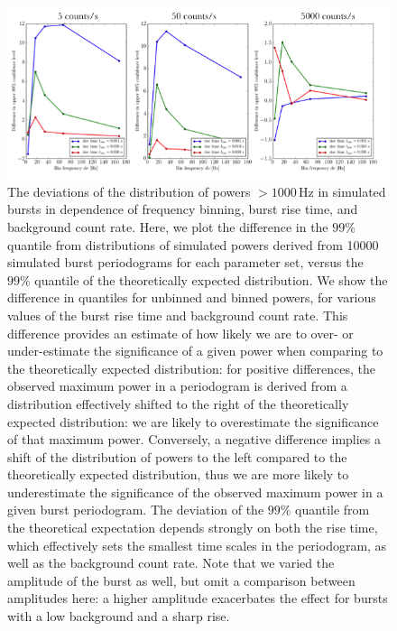 \documentclass[numberedappendix]{emulateapj}
\newcommand{\hz}{\,\mathrm{Hz}}
\begin{document}
\begin{figure}[htbp]
\begin{center}
\includegraphics[width=18cm]{weak_burst_sims.png}
\caption{The deviations of the distribution of powers $>1000 \hz$ in simulated bursts in dependence of frequency binning, burst rise time, and background count rate. Here, we plot the difference in the $99\%$ quantile from distributions of simulated powers derived from 10000 simulated burst periodograms for each parameter set, versus the $99\%$ quantile of the theoretically expected distribution. We show the difference in quantiles for unbinned and binned powers, for various values of the burst rise time and background count rate. This difference provides an estimate of how likely we are to over- or under-estimate the significance of a given power when comparing to the theoretically expected distribution: for positive differences, the observed maximum power in a periodogram is derived from a distribution effectively shifted to the right of the theoretically expected distribution: we are likely to overestimate the significance of that maximum power. Conversely, a negative difference implies a shift of the distribution of powers to the left compared to the theoretically expected distribution, thus we are more likely to underestimate the significance of the observed maximum power in a given burst periodogram. The deviation of the $99\%$ quantile from the theoretical expectation depends strongly on both the rise time, which effectively sets the smallest time scales in the periodogram, as well as the background count rate. Note that we varied the amplitude of the burst as well, but omit a comparison between amplitudes here: a higher amplitude exacerbates the effect for bursts with a low background and a sharp rise.}
\label{fig:weak_bursts}
\end{center}
\end{figure}
\end{document}
